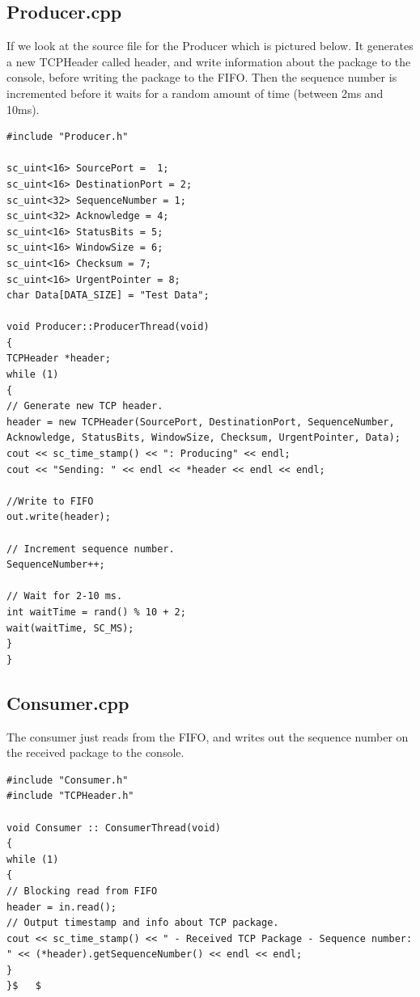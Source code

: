 \subsection{Producer.cpp}

If we look at the source file for the Producer which is pictured below. 
It generates a new TCPHeader called header, and write information about the package to the console, before writing the package to the FIFO. Then the sequence number is incremented before it waits for a random amount of time (between 2ms and 10ms). 

\begin{lstlisting}
#include "Producer.h"

sc_uint<16> SourcePort =  1;
sc_uint<16> DestinationPort = 2;
sc_uint<32> SequenceNumber = 1;
sc_uint<32> Acknowledge = 4;
sc_uint<16> StatusBits = 5;
sc_uint<16> WindowSize = 6;
sc_uint<16> Checksum = 7;
sc_uint<16> UrgentPointer = 8;
char Data[DATA_SIZE] = "Test Data";

void Producer::ProducerThread(void)
{
TCPHeader *header;
while (1)
{
// Generate new TCP header.
header = new TCPHeader(SourcePort, DestinationPort, SequenceNumber, Acknowledge, StatusBits, WindowSize, Checksum, UrgentPointer, Data);
cout << sc_time_stamp() << ": Producing" << endl;
cout << "Sending: " << endl << *header << endl << endl;

//Write to FIFO
out.write(header);

// Increment sequence number.
SequenceNumber++;

// Wait for 2-10 ms.
int waitTime = rand() % 10 + 2;
wait(waitTime, SC_MS);
}
}
\end{lstlisting}



\subsection{Consumer.cpp}
The consumer just reads from the FIFO, and writes out the sequence number on the received package to the console. 
\begin{lstlisting}
#include "Consumer.h"
#include "TCPHeader.h"

void Consumer :: ConsumerThread(void)
{
while (1)
{
// Blocking read from FIFO
header = in.read();
// Output timestamp and info about TCP package.
cout << sc_time_stamp() << " - Received TCP Package - Sequence number: " << (*header).getSequenceNumber() << endl << endl;
}
}$ 	 $
\end{lstlisting}



